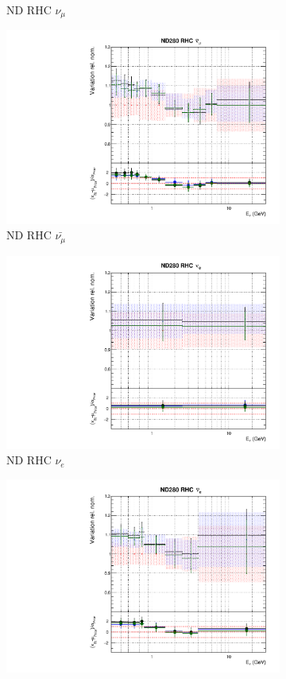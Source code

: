 \begin{figure}
\begin{subfigure}{0.24\textwidth}
  \caption{ND RHC $\nu_{\mu}$}
\end{subfigure}
\begin{subfigure}{0.24\textwidth}
  \centering
  \includegraphics[width=0.95\linewidth]{figs/polydataflux_5}
  \caption{ND RHC $\bar{\nu_{\mu}}$}
\end{subfigure}
\begin{subfigure}{0.24\textwidth}
  \centering
  \includegraphics[width=0.95\linewidth]{figs/polydataflux_6}
  \caption{ND RHC $\nu_{e}$}
\end{subfigure}
\vspace{15mm}
\begin{subfigure}{0.24\textwidth}
  \centering
  \includegraphics[width=0.95\linewidth]{figs/polydataflux_7}

\end{subfigure}
\end{figure}
